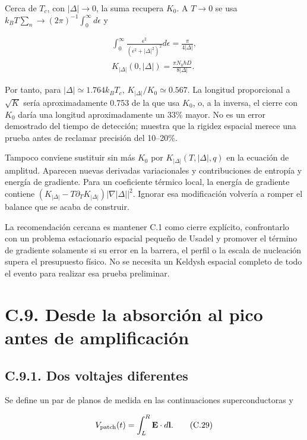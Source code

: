 \documentclass[
  spanish,
  10pt,
  a4paper,
]{article}
\begin{document}
Cerca de \(T_c\), con \(|\Delta|\to0\), la suma recupera \(K_0\). A
\(T\to0\) se usa \(k_BT\sum_n\to(2\pi)^{-1}\int_0^\infty d\epsilon\) y

\[
\begin{gathered}
\int_0^\infty\frac{\epsilon^2}{(\epsilon^2+|\Delta|^2)^2}d\epsilon
=\frac\pi{4|\Delta|},\\
K_{|\Delta|}(0,|\Delta|)=\frac{\pi N_0\hbar D}{8|\Delta|}.
\end{gathered} \tag{C.28}
\]

Por tanto, para \(|\Delta|\simeq1.764k_BT_c\),
\(K_{|\Delta|}/K_0\simeq0.567\). La longitud proporcional a \(\sqrt K\)
sería aproximadamente 0.753 de la que usa \(K_0\), o, a la inversa, el
cierre con \(K_0\) daría una longitud aproximadamente un 33\% mayor. No
es un error demostrado del tiempo de detección; muestra que la rigidez
espacial merece una prueba antes de reclamar precisión del 10--20\%.

Tampoco conviene sustituir sin más \(K_0\) por
\(K_{|\Delta|}(T,|\Delta|,q)\) en la ecuación de amplitud. Aparecen
nuevas derivadas variacionales y contribuciones de entropía y energía de
gradiente. Para un coeficiente térmico local, la energía de gradiente
contiene \((K_{|\Delta|}-T\partial_TK_{|\Delta|})|\nabla |\Delta||^2\).
Ignorar esa modificación volvería a romper el balance que se acaba de
construir.

La recomendación cercana es mantener C.1 como cierre explícito,
confrontarlo con un problema estacionario espacial pequeño de Usadel y
promover el término de gradiente solamente si su error en la barrera, el
perfil o la escala de nucleación supera el presupuesto físico. No se
necesita un Keldysh espacial completo de todo el evento para realizar
esa prueba preliminar.

\section{C.9. Desde la absorción al pico antes de
amplificación}\label{c.9.-desde-la-absorciuxf3n-al-pico-antes-de-amplificaciuxf3n}

\subsection{C.9.1. Dos voltajes
diferentes}\label{c.9.1.-dos-voltajes-diferentes}

Se define un par de planos de medida en las continuaciones
superconductoras y

\[
V_{\rm patch}(t)=\int_L^R\mathbf E\cdot d\mathbf l.
\tag{C.29}
\]
\end{document}
